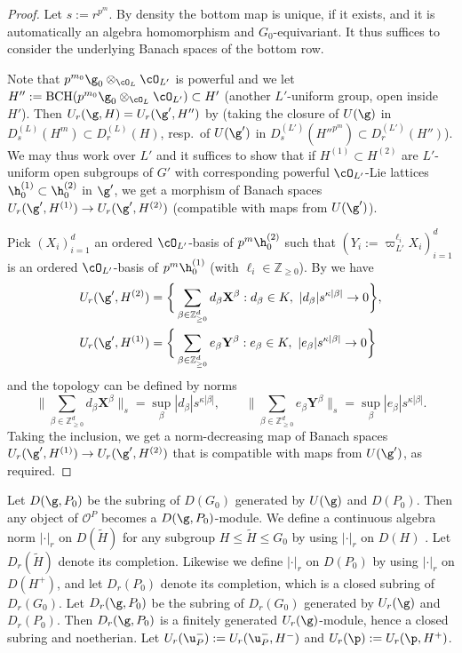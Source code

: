 \documentclass[a4paper]{amsart}
\numberwithin{equation}{section}
\theoremstyle{remark}
\theoremstyle{definition}
\newcommand{\Z}{\mathbb{Z}}
\DeclareMathOperator{\BCH}{BCH}
\newcommand{\wt}[1]{\widetilde{#1}}
\begin{document}
\begin{proof}
  Let $s := r^{p^m}$. By density the bottom map is unique, if it exists, and it is automatically an algebra homomorphism and $G_0$-equivariant.
  It thus suffices to consider the underlying Banach spaces of the bottom row.

  Note that $p^{m_0}\g_0 \otimes_{\cO_L} \cO_{L'}$ is powerful and we let $H'' := \BCH(p^{m_0}\g_0 \otimes_{\cO_L} \cO_{L'}) \subset H'$ (another $L'$-uniform group, open inside $H'$).
  Then $U_r(\g,H) = U_r(\g',H'')$ by \cite[\S5, \S6]{schmidt} (taking the closure of $U(\g)$ in $D^{(L)}_s(H^m) \subset D^{(L)}_r(H)$, resp.\ of $U(\g')$ in $D^{(L')}_s(H''^{p^m}) \subset D^{(L')}_r(H'')$).
  We may thus work over $L'$ and it suffices to show that if $H^{(1)} \subset H^{(2)}$ are $L'$-uniform open subgroups of $G'$
  with corresponding powerful $\cO_{L'}$-Lie lattices $\h_0^{(1)} \subset \h_0^{(2)}$ in $\g'$,   we get a morphism of Banach spaces $U_r(\g',H^{(1)}) \to U_r(\g',H^{(2)})$
  (compatible with maps from $U(\g')$).
  
  Pick $(X_i)_{i=1}^d$ an ordered $\cO_{L'}$-basis of $p^m \h_0^{(2)}$ such that $(Y_i := \varpi_{L'}^{\ell_i} X_i)_{i=1}^d$ is
  an ordered $\cO_{L'}$-basis of $p^m \h_0^{(1)}$ (with $\ell_i \in \Z_{\ge 0}$). By \cite[\S5, \S6]{schmidt} we have
  \begin{align*}
    U_r(\g',H^{(2)}) &= \bigg\{ \sum_{\beta\in\Z_{\ge 0}^{d}} d_\beta \mathbf{X}^\beta : d_\beta \in K,\ |d_\beta| s^{\kappa|\beta|} \to 0 \bigg\},\\
    U_r(\g',H^{(1)}) &= \bigg\{ \sum_{\beta\in\Z_{\ge 0}^{d}} e_\beta \mathbf{Y}^\beta : e_\beta \in K,\ |e_\beta| s^{\kappa|\beta|} \to 0 \bigg\}
  \end{align*}
  and the topology can be defined by norms
  \begin{equation*}
    \bigg\lVert \sum_{\beta \in \Z_{\ge 0}^d} d_\beta \mathbf{X}^\beta \bigg\rVert_s = \sup_\beta |d_\beta| s^{\kappa|\beta|},\qquad
    \bigg\lVert \sum_{\beta \in \Z_{\ge 0}^d} e_\beta \mathbf{Y}^\beta \bigg\rVert_s = \sup_\beta |e_\beta| s^{\kappa|\beta|}.
  \end{equation*}
  Taking the inclusion, we get a norm-decreasing map of Banach spaces $U_r(\g',H^{(1)}) \to U_r(\g',H^{(2)})$ that is
  compatible with maps from $U(\g')$, as required.
\end{proof}



  

Let $D(\g,P_0)$ be the subring of $D(G_0)$ generated by $U(\g)$ and $D(P_0)$. 
Then any object of $\mathcal O^P$ becomes a $D(\g,P_0)$-module.
We define a continuous algebra norm $\lvert\cdot\rvert_r$ on $D(\wt H)$ for any subgroup $H \le \wt H \le G_0$ by using $\lvert\cdot\rvert_r$ on $D(H)$ \cite[(5.5.5)]{OS2}.
Let $D_r(\wt H)$ denote its completion.
Likewise we define $\lvert\cdot\rvert_r$ on $D(P_0)$ by using $\lvert\cdot\rvert_r$ on $D(H^+)$, and let $D_r(P_0)$ denote its completion, which is a closed subring of $D_r(G_0)$.
Let $D_r(\g,P_0)$ be the subring of $D_r(G_0)$ generated by $U_r(\g)$ and $D_r(P_0)$.
Then $D_r(\g,P_0)$ is a finitely generated $U_r(\g)$-module, hence a closed subring and noetherian.
Let $U_r(\u_P^-) := U_r(\u_P^-,H^-)$ and $U_r(\p) := U_r(\p,H^+)$.
\end{document}

